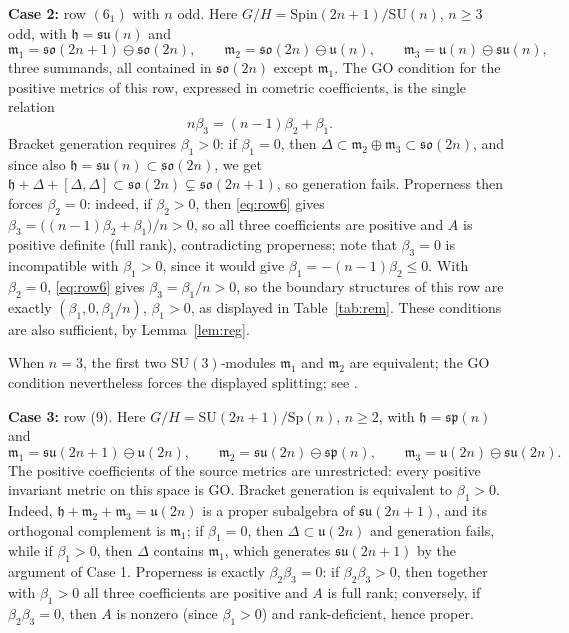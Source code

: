 \documentclass[12pt]{amsart}
\theoremstyle{plain}
\theoremstyle{definition}
\theoremstyle{remark}
\newcommand{\alg}[1]{\mathfrak{#1}}
\begin{document}
\textbf{Case 2:} row $(6_{1})$ with $n$ odd.
Here $G/H=\mathrm{Spin}(2n+1)/\mathrm{SU}(n)$, $n\ge3$ odd, with $\alg{h}=\alg{su}(n)$ and
\[ \alg{m}_1=\alg{so}(2n{+}1)\ominus\alg{so}(2n),\qquad
\alg{m}_2=\alg{so}(2n)\ominus\alg{u}(n),\qquad
\alg{m}_3=\alg{u}(n)\ominus\alg{su}(n), \]
three summands, all contained in $\alg{so}(2n)$ except $\alg{m}_1$. The GO condition for the
positive metrics of this row, expressed in cometric coefficients, is the single relation
\begin{equation}\label{eq:row6}
n\beta_3=(n-1)\beta_2+\beta_1.
\end{equation}
Bracket generation requires $\beta_1>0$: if $\beta_1=0$, then
$\Delta\subset\alg{m}_2\oplus\alg{m}_3\subset\alg{so}(2n)$, and since also
$\alg{h}=\alg{su}(n)\subset\alg{so}(2n)$, we get
$\alg{h}+\Delta+[\Delta,\Delta]\subset\alg{so}(2n)\subsetneq\alg{so}(2n+1)$, so generation fails.
Properness then forces $\beta_2=0$: indeed, if $\beta_2>0$, then \eqref{eq:row6} gives
$\beta_3=\big((n-1)\beta_2+\beta_1\big)/n>0$, so all three coefficients are positive and $A$ is
positive definite (full rank), contradicting properness; note that $\beta_3=0$ is incompatible
with $\beta_1>0$, since it would give $\beta_1=-(n-1)\beta_2\le0$. With $\beta_2=0$,
\eqref{eq:row6} gives $\beta_3=\beta_1/n>0$, so the boundary structures of this row are exactly
$(\beta_1,0,\beta_1/n)$, $\beta_1>0$, as displayed in Table~\ref{tab:rem}. These conditions are
also sufficient, by Lemma~\ref{lem:reg}.

When $n=3$, the first two $\mathrm{SU}(3)$-modules $\alg{m}_1$ and $\alg{m}_2$ are equivalent; the
GO condition nevertheless forces the displayed splitting; see \cite[Sec.~5.2.3]{ChenNN}.

\textbf{Case 3:} row (9).
Here $G/H=\mathrm{SU}(2n+1)/\mathrm{Sp}(n)$, $n\ge2$, with $\alg{h}=\alg{sp}(n)$ and
\[ \alg{m}_1=\alg{su}(2n{+}1)\ominus\alg{u}(2n),\qquad
\alg{m}_2=\alg{su}(2n)\ominus\alg{sp}(n),\qquad
\alg{m}_3=\alg{u}(2n)\ominus\alg{su}(2n). \]
The positive coefficients of the source metrics are unrestricted: every positive invariant metric
on this space is GO. Bracket generation is equivalent to $\beta_1>0$. Indeed,
$\alg{h}+\alg{m}_2+\alg{m}_3=\alg{u}(2n)$ is a proper subalgebra of $\alg{su}(2n+1)$, and its
orthogonal complement is $\alg{m}_1$; if $\beta_1=0$, then $\Delta\subset\alg{u}(2n)$ and
generation fails, while if $\beta_1>0$, then $\Delta$ contains $\alg{m}_1$, which generates
$\alg{su}(2n+1)$ by the argument of Case 1. Properness is exactly $\beta_2\beta_3=0$: if
$\beta_2\beta_3>0$, then together with $\beta_1>0$ all three coefficients are positive and $A$ is
full rank; conversely, if $\beta_2\beta_3=0$, then $A$ is nonzero (since $\beta_1>0$) and
rank-deficient, hence proper.
\end{document}
